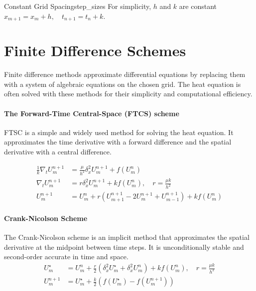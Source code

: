 \begin{remark}{Constant Grid Spacing}{step_sizes}
  For simplicity, \(h\) and \(k\) are constant \( x_{m+1} = x_m + h,\quad t_{n+1} = t_n + k \).
\end{remark}

\section{Finite Difference Schemes}

Finite difference methods approximate differential equations by replacing them with a system of algebraic equations on the chosen grid.
The heat equation is often solved with these methods for their simplicity and computational efficiency.

\paragraph{The Forward-Time Central-Space (FTCS) scheme}

FTSC is a simple and widely used method for solving the heat equation.
It approximates the time derivative with a forward difference and the spatial derivative with a central difference.


\begin{align*}
  \frac{1}{k} \nabla_t U_m^{n+1} & = \frac{\mu}{h^2} \delta_x^2 U_m^{n+1} + f(U_m^n)                                              \\
  \nabla_t U_m^{n+1}             & = r \delta_x^2 U_m^{n+1} + k f(U_m^n), \quad r = \frac{\mu k}{h^2}                             \\
  U_m^{n+1}                      & = U_m^n + r \left( U_{m+1}^{n+1} - 2 U_m^{n+1} + U_{m-1}^{n+1} \right) + k f(U_m^n) \tag{FTCS}
\end{align*}

\paragraph{Crank-Nicolson Scheme}

The Crank-Nicolson scheme is an implicit method that approximates the spatial derivative at the midpoint between time steps. It is unconditionally stable and second-order accurate in time and space.
\begin{align*}
  U_m^\star & = U_m^n + \frac{r}{2} \left( \delta_x^2 U_m^\star + \delta_x^2 U_m^n \right) + k f(U_m^n), \quad r = \frac{\mu k}{h^2} \\
  U_m^{n+1} & = U_m^\star + \frac{k}{2} \left( f(U_m^\star) - f(U_m^{n+1}) \right) \tag{Crank-Nicolson}
\end{align*}

